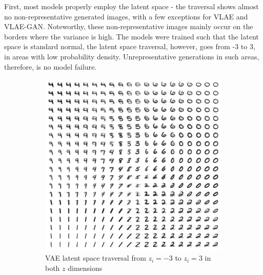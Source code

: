 First, most models properly employ the latent space - the traversal shows almost no non-representative generated images, with a few exceptions for \ac{VLAE} and \ac{VLAE}-\ac{GAN}.
Noteworthy, these non-representative images mainly occur on the borders where the variance is high.
The models were trained such that the latent space is standard normal, the latent space traversal, however, goes from -3 to 3, in areas with low probability density.
Unrepresentative generations in such areas, therefore, is no model failure.

\begin{figure}
    \centering
    \begin{subfigure}{.45\textwidth}
        \centering
        \includegraphics[width=\textwidth]{images/latent_space_traversals/vae_mnist.png}
        \caption{\ac{VAE} latent space traversal from $z_i=-3$ to $z_i=3$ in both $z$ dimensions}
    \end{subfigure}
    \hfill
    \begin{subfigure}{.45\textwidth}
        \centering

\end{subfigure}
\end{figure}
